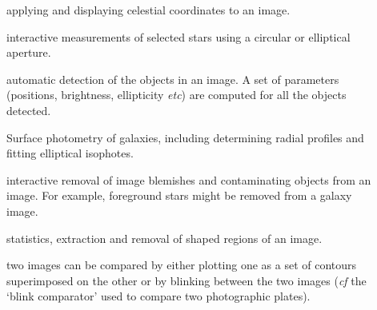 \documentclass[twoside,11pt]{starlink}
\begin{document}
\begin{description}

  \item[]
   applying and displaying celestial coordinates to an image.

  \item[]
   interactive measurements of selected stars using a circular or
   elliptical aperture.

  \item[]
   automatic detection of the objects in an image.  A set of parameters
   (positions, brightness, ellipticity \emph{etc}\/) are computed for all
   the objects detected.

  \item[]
   Surface photometry of galaxies, including determining radial profiles
   and fitting elliptical isophotes.

  \item[]
   interactive removal of image blemishes and contaminating objects from
   an image.  For example, foreground stars might be removed from a
   galaxy image.

  \item[]
   statistics, extraction and removal of shaped regions of an image.

  \item[]
   two images can be compared by either plotting one as a set of contours
   superimposed on the other or by blinking between the two images (\textit{cf}\/ the `blink comparator' used to compare two photographic plates).


\end{description}
\end{document}
